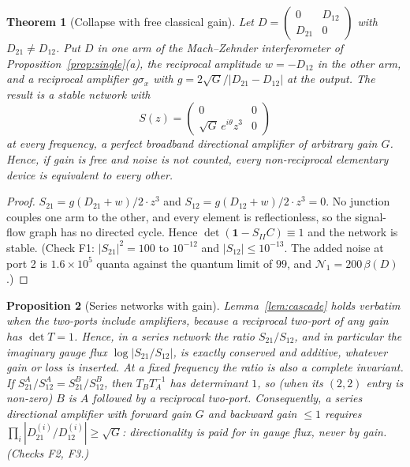 \documentclass[11pt]{article}
\newtheorem{theorem}{Theorem}
\newtheorem{proposition}[theorem]{Proposition}
\theoremstyle{definition}
\theoremstyle{remark}
\newcommand{\NN}{\mathcal N_1}
\newcommand{\D}{\mathbb D}
\newcommand{\one}{\mathbf 1}
\begin{document}
\begin{theorem}[Collapse with free classical gain]\label{thm:collapse}
Let $D=\left(\begin{smallmatrix}0&D_{12}\\D_{21}&0\end{smallmatrix}\right)$ with $D_{21}\ne D_{12}$. Put $D$ in one arm of the Mach--Zehnder interferometer of Proposition~\ref{prop:single}(a), the reciprocal amplitude $w=-D_{12}$ in the other arm, and a reciprocal amplifier $g\sigma_x$ with $g=2\sqrt G/|D_{21}-D_{12}|$ at the output. The result is a stable network with
\[
S(z)=\begin{pmatrix}0&0\\\sqrt G\,e^{i\theta}z^{3}&0\end{pmatrix}
\]
at every frequency, a perfect broadband directional amplifier of arbitrary gain $G$. Hence, if gain is free and noise is not counted, every non-reciprocal elementary device is equivalent to every other.
\end{theorem}
\begin{proof}
$S_{21}=g(D_{21}+w)/2\cdot z^3$ and $S_{12}=g(D_{12}+w)/2\cdot z^3=0$. No junction couples one arm to the other, and every element is reflectionless, so the signal-flow graph has no directed cycle. Hence $\det(\one-S_{II}C)\equiv1$ and the network is stable. (Check F1: $|S_{21}|^2=100$ to $10^{-12}$ and $|S_{12}|\le10^{-13}$. The added noise at port 2 is $1.6\times10^5$ quanta against the quantum limit of $99$, and $\NN=200\,\beta(D)$.)
\end{proof}

\begin{proposition}[Series networks with gain]\label{prop:seriesgain}
Lemma~\ref{lem:cascade} holds verbatim when the two-ports include amplifiers, because a reciprocal two-port of any gain has $\det T=1$. Hence, in a series network the ratio $S_{21}/S_{12}$, and in particular the imaginary gauge flux $\log|S_{21}/S_{12}|$, is exactly conserved and additive, whatever gain or loss is inserted. At a fixed frequency the ratio is also a complete invariant. If $S^A_{21}/S^A_{12}=S^B_{21}/S^B_{12}$, then $T_BT_A^{-1}$ has determinant $1$, so (when its $(2,2)$ entry is non-zero) $B$ is $A$ followed by a reciprocal two-port. Consequently, a series directional amplifier with forward gain $G$ and backward gain $\le1$ requires $\prod_i|D^{(i)}_{21}/D^{(i)}_{12}|\ge\sqrt G$: directionality is paid for in gauge flux, never by gain. (Checks F2, F3.)
\end{proposition}
\end{document}
